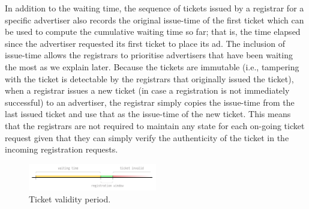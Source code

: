 In addition to the waiting time,  the sequence of tickets issued by a registrar for a specific advertiser also records the original issue-time of the first ticket which can be used to compute the cumulative waiting time so far; that is, the time elapsed since the advertiser requested its first ticket to place its ad. The inclusion of issue-time allows the registrars to prioritise advertisers that have been waiting the most as we explain later. Because the tickets are immutable (i.e., tampering with the ticket is detectable by the registrars that originally issued the ticket), when a registrar issues a new ticket (in case a registration is not immediately successful) to an advertiser, the registrar simply copies the issue-time from the last issued ticket and use that as the issue-time of the new ticket. This means that the registrars are not required to maintain any state for each on-going ticket request given that they can simply verify the authenticity of the ticket in the incoming registration requests. 

    
\begin{figure}
    \includegraphics[width=0.5\textwidth]{img/ticket-validity}
    \caption{Ticket validity period.}
    \label{fig:ticket_validity}
\end{figure}


